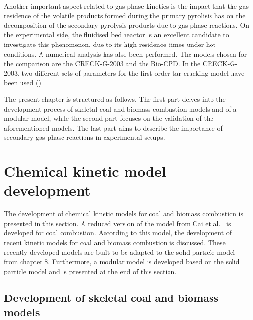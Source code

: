 \begin{refsection}
\\
Another important aspect related to gas-phase kinetics is the impact that the gas residence of the volatile products formed during the primary pyrolisis has on the decomposition of the secondary pyrolysis products due to gas-phase reactions. On the experimental side, the fluidised bed reactor is an excellent candidate to investigate this phenomenon, due to its high residence times under hot conditions. A numerical analysis has also been performed. The models chosen for the comparison are the CRECK-G-2003 and the Bio-CPD. In the CRECK-G-2003, two different sets of parameters for the first-order tar cracking model have been used (\cite{Fagbemi2001, Pielsticker2024}).

The present chapter is structured as follows. The first part delves into the development process of skeletal coal and biomass combustion models and of a modular  model, while the second part focuses on the validation of the aforementioned models. The last part aims to describe the importance of secondary gas-phase reactions in experimental setups.


\newpage
\section{Chemical kinetic model development}
The development of chemical kinetic models for coal and biomass combustion is presented in this section. A reduced version of the model from Cai et al.~\cite{Cai2020} is developed for coal combustion. According to this model, the development of recent kinetic models for coal and biomass combustion is discussed. These recently developed models are built to be adapted to the solid particle model from chapter 8. Furthermore, a modular  model is developed based on the solid particle model and is presented at the end of this section.


\subsection{Development of skeletal coal and biomass models}


\end{refsection}
